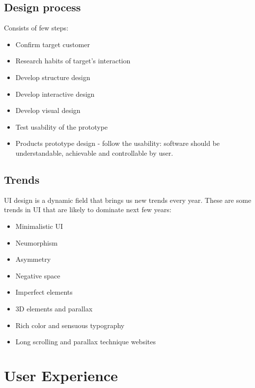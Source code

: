 \documentclass[10pt,twoside,english,a4paper]{article}
\begin{document}
\subsection{Design process}
Consists of few steps: 
\begin{itemize}
\item Confirm target customer
\item Research habits of target's interaction
\item Develop structure design
\item Develop interactive design
\item Develop visual design
\item Test usability of the prototype
\item Products prototype design - follow the usability: software should be understandable, achievable and controllable by user. \cite{XiangqianFu2010}
\end{itemize}

\subsection{Trends}
UI design is a dynamic field that brings us new trends every year. These are some trends in UI that are likely to dominate next few years:
\begin{itemize}
\item Minimalistic UI
\item Neumorphism
\item Asymmetry
\item Negative space
\item Imperfect elements
\item 3D elements and parallax
\item Rich color and sensuous typography
\item Long scrolling and parallax technique websites 
\cite{UItrends}
\cite{UnderstandingUI}
\end{itemize}

\section{User Experience} \label{UX}
\end{document}
